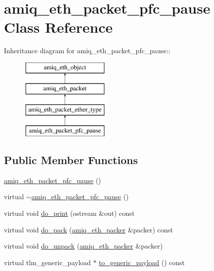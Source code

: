 \hypertarget{classamiq__eth__packet__pfc__pause}{
\section{amiq\_\-eth\_\-packet\_\-pfc\_\-pause Class Reference}
\label{classamiq__eth__packet__pfc__pause}
}
Inheritance diagram for amiq\_\-eth\_\-packet\_\-pfc\_\-pause::\begin{figure}[H]
\begin{center}
\leavevmode
\includegraphics[height=4cm]{classamiq__eth__packet__pfc__pause}
\end{center}
\end{figure}
\subsection*{Public Member Functions}
\begin{DoxyCompactItemize}
\item 
\hyperlink{classamiq__eth__packet__pfc__pause_a28632a96a7692e0c6671be8e6f274b38}{amiq\_\-eth\_\-packet\_\-pfc\_\-pause} ()
\item 
virtual \hyperlink{classamiq__eth__packet__pfc__pause_ac065ae8ab2a4be786b1aee99ebfc8aeb}{$\sim$amiq\_\-eth\_\-packet\_\-pfc\_\-pause} ()
\item 
virtual void \hyperlink{classamiq__eth__packet__pfc__pause_a58c67ea445a72bc6c1c584625d642899}{do\_\-print} (ostream \&out) const 
\item 
virtual void \hyperlink{classamiq__eth__packet__pfc__pause_ac06dfc3d16b73113bbd42460ddbc9c4b}{do\_\-pack} (\hyperlink{classamiq__eth__packer}{amiq\_\-eth\_\-packer} \&packer) const 
\item 
virtual void \hyperlink{classamiq__eth__packet__pfc__pause_abc86009030a38ab03469c697ffec73f6}{do\_\-unpack} (\hyperlink{classamiq__eth__packer}{amiq\_\-eth\_\-packer} \&packer)
\item 
virtual tlm\_\-generic\_\-payload $\ast$ \hyperlink{classamiq__eth__packet__pfc__pause_aaf46b734371ab160eba8764a4e398516}{to\_\-generic\_\-payload} () const 
\end{DoxyCompactItemize}
